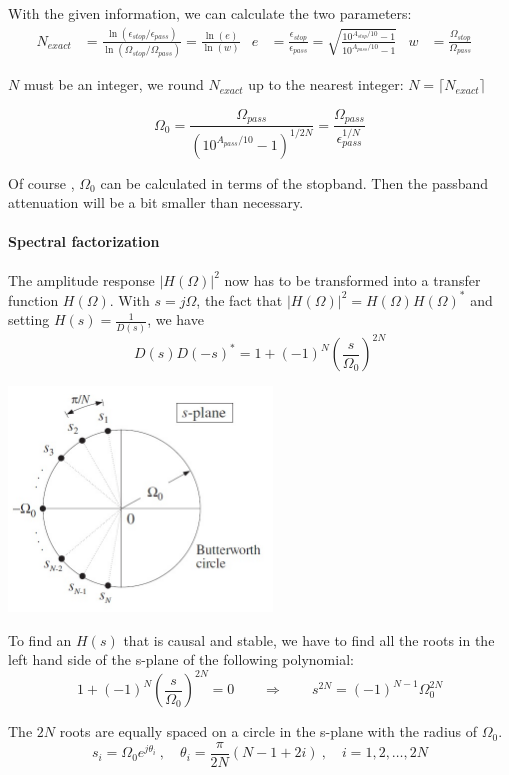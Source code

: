 With the given information, we can calculate the two parameters:
\begin{align*}
	N_{exact} &= \frac{
			\ln(\epsilon_{stop} / \epsilon_{pass})
		}{
			\ln(\Omega_{stop} / \Omega_{pass})
		}
	= \frac{\ln(e)}{\ln(w)} &
	e &= \frac{\epsilon_{stop}}{\epsilon_{pass}}
	   = \sqrt{\frac{10^{A_{stop}/10} -1}{10^{A_{pass}/10} -1}}&
	w &= \frac{\Omega_{stop}}{\Omega_{pass}}&
\end{align*}

$N$ must be an integer, we round $N_{exact}$ up to the nearest integer: $N = \lceil N_{exact} \rceil$

\[
	\Omega_0 = \frac{
			\Omega_{pass}
		}{
			\left(10^{A_{pass}/10}-1\right)^{1/2N}
		} = \frac{
			\Omega_{pass}
		}{
			\epsilon_{pass}^{1/N}
		}
\]

Of course , $\Omega_0$ can be calculated in terms of the stopband. Then the
passband attenuation will be a bit smaller than necessary.

\paragraph{Spectral factorization}
The amplitude response $\left|H(\Omega)\right|^2$ now has to be transformed
into a transfer function $H(\Omega)$. With $s = j \Omega$, the fact that
$\left|H(\Omega)\right|^2 = H(\Omega) H(\Omega)^*$ and setting
$H(s) = \frac{1}{D(s)}$, we have
\begin{equation*}
	D(s) D(-s)^* = 1 + (-1)^N \left( \frac{s}{\Omega_0} \right)^{2N}
\end{equation*}

\vspace{1em}

\begin{multicols}{2}
	\includegraphics[width=7cm]{images/IIR_ButterworthCircle.jpg}
\vfill
\columnbreak

	To find an $H(s)$ that is causal and stable, we have to find all the roots
	in the left hand side of the s-plane of the following polynomial:
	\begin{equation*}
		1 + (-1)^N \left(\frac{s}{\Omega_0}\right)^{2N} = 0 \qquad \Rightarrow \qquad s^{2N} = (-1)^{N-1} \Omega_0^{2N}
	\end{equation*}

	The $2N$ roots are equally spaced on a circle in the s-plane with the radius
	of $\Omega_0$.
	\begin{equation*}
		s_i = \Omega_0 e^{j \theta_i} \:, \quad \theta_i = \frac{\pi}{2N} (N - 1 + 2i) \:, \quad  i = 1,2,\ldots,2N
	\end{equation*}
\end{multicols}

